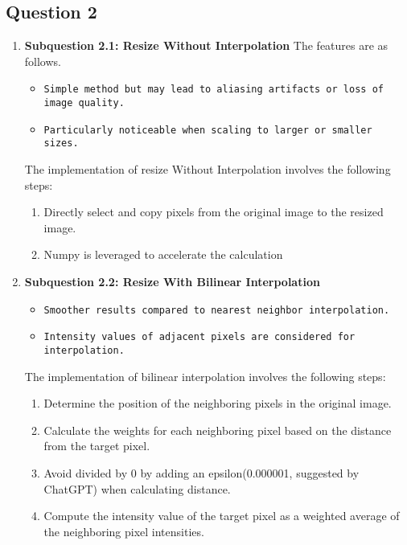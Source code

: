 \documentclass{article}
\begin{document}
\subsection{Question 2}
\begin{enumerate}
    \item \textbf{Subquestion 2.1: Resize Without Interpolation}
    The features are as follows. 
    \begin{itemize}
        \item \texttt{Simple method but may lead to aliasing artifacts or loss of image quality.} 
        \item \texttt{Particularly noticeable when scaling to larger or smaller sizes.} 
    \end{itemize}
    The implementation of resize Without Interpolation involves the following steps:
    \begin{enumerate}
        \item Directly select and copy pixels from the original image to the resized image.
        \item Numpy is leveraged to accelerate the calculation
    \end{enumerate}
    
    \item \textbf{Subquestion 2.2: Resize With Bilinear Interpolation}
        \begin{itemize}
            \item \texttt{Smoother results compared to nearest neighbor interpolation.}
            \item \texttt{Intensity values of adjacent pixels are considered for interpolation.}
        \end{itemize}
    The implementation of bilinear interpolation involves the following steps:
    \begin{enumerate}
        \item Determine the position of the neighboring pixels in the original image.
        \item Calculate the weights for each neighboring pixel based on the distance from the target pixel. 
        \item Avoid divided by 0 by adding an epsilon(0.000001, suggested by ChatGPT) when calculating distance.
        \item Compute the intensity value of the target pixel as a weighted average of the neighboring pixel intensities.
    \end{enumerate}
\end{enumerate}
 
\end{document}
